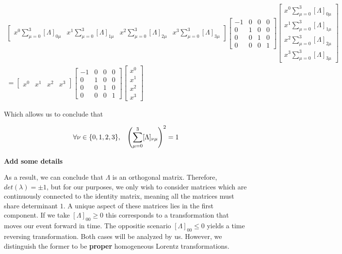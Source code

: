 \documentclass[10pt]{ucthesis}
\begin{document}
\begin{equation}
\begin{aligned}
	\begin{bmatrix}
		x^0\sum_{\mu=0}^3 [\Lambda]_{0\mu}&
		x^1\sum_{\mu=0}^3 [\Lambda]_{1\mu}&
		x^2\sum_{\mu=0}^3 [\Lambda]_{2\mu}&
		x^3\sum_{\mu=0}^3 [\Lambda]_{3\mu}
	\end{bmatrix}
	\begin{bmatrix}
	-1 & 0 & 0 & 0\\
	 0 & 1 & 0 & 0\\
	0 & 0 & 1 & 0\\
	0 & 0 & 0 & 1
	\end{bmatrix}
	\begin{bmatrix}
		x^0\sum_{\mu=0}^3 [\Lambda]_{0\mu}\\
		x^1\sum_{\mu=0}^3 [\Lambda]_{1\mu}\\
		x^2\sum_{\mu=0}^3 [\Lambda]_{2\mu}\\
		x^3\sum_{\mu=0}^3 [\Lambda]_{3\mu}
	\end{bmatrix}
	\\=
	\begin{bmatrix}
		x^0&
		x^1&
		x^2&
		x^3
	\end{bmatrix}
	\begin{bmatrix}
	-1 & 0 & 0 & 0\\
	 0 & 1 & 0 & 0\\
	0 & 0 & 1 & 0\\
	0 & 0 & 0 & 1
	\end{bmatrix}
	\begin{bmatrix}
		x^0\\
		x^1\\
		x^2\\
		x^3
	\end{bmatrix}
\end{aligned}
\end{equation}

Which allows us to conclude that 

\begin{equation}
\begin{aligned}
	\forall \nu \in \{0,1,2,3\},\hspace{3mm} \left(\sum_{\mu=0}^3[\Lambda]_{\nu\mu}\right)^2 = 1
\end{aligned}
\end{equation}


\textbf{Add some details}

As a result, we can conclude that $\Lambda$ is an orthogonal matrix. Therefore, $det(\lambda) = \pm 1$, but for our purposes, we only wish to consider matrices which are continuously connected to the identity matrix, meaning all the matrices must share determinant $1$. A unique aspect of these matrices lies in the first component. If we take $[\Lambda]_{00}\geq 0$ this corresponds to a transformation that moves our event forward in time. The oppositie scenario $[\Lambda]_{00}\leq 0$ yields a time reversing transformation. Both cases will be analyzed by us. However, we distinguish the former to be \textbf{proper} homogeneous Lorentz transformations.
\end{document}

